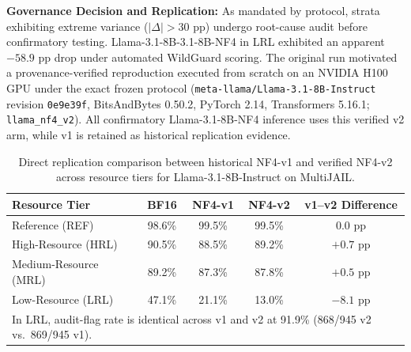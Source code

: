 \documentclass{article}
\newcommand{\llama}{Llama-3.1-8B}
\begin{document}
\textbf{Governance Decision and Replication:} As mandated by protocol, strata exhibiting extreme variance ($|\Delta| > 30$ pp) undergo root-cause audit before confirmatory testing. \llama{}-3.1-8B-NF4 in LRL exhibited an apparent $-58.9$ pp drop under automated WildGuard scoring. The original run motivated a provenance-verified reproduction executed from scratch on an NVIDIA H100 GPU under the exact frozen protocol (\texttt{meta-llama/Llama-3.1-8B-Instruct} revision \texttt{0e9e39f}, BitsAndBytes 0.50.2, PyTorch 2.14, Transformers 5.16.1; \texttt{llama\_nf4\_v2}). All confirmatory \llama{}-NF4 inference uses this verified v2 arm, while v1 is retained as historical replication evidence.

\begin{table}[h]
\centering
\small
\caption{Direct replication comparison between historical NF4-v1 and verified NF4-v2 across resource tiers for \llama{}-Instruct on MultiJAIL.}
\label{tab:v1_v2_repl}
\vspace{3pt}
\begin{tabular}{lcccc}
\toprule
Resource Tier & BF16 & NF4-v1 & NF4-v2 & v1--v2 Difference \\
\midrule
Reference (REF)      & 98.6\% & 99.5\% & 99.5\% & $0.0$ pp \\
High-Resource (HRL)   & 90.5\% & 88.5\% & 89.2\% & $+0.7$ pp \\
Medium-Resource (MRL) & 89.2\% & 87.3\% & 87.8\% & $+0.5$ pp \\
Low-Resource (LRL)    & 47.1\% & 21.1\% & 13.0\% & $-8.1$ pp \\
\bottomrule
\multicolumn{5}{l}{\footnotesize In LRL, audit-flag rate is identical across v1 and v2 at 91.9\% (868/945 v2 vs.\ 869/945 v1).} \\
\end{tabular}
\vspace{-3pt}
\end{table}
\end{document}
